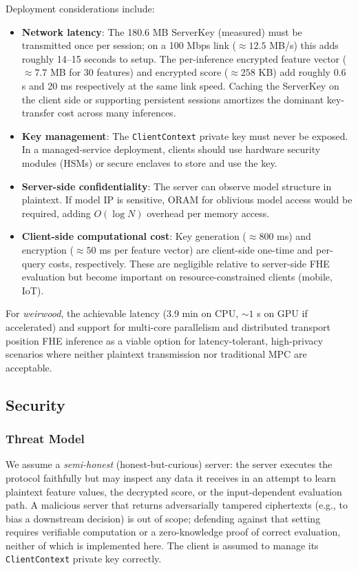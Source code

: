 \documentclass[12pt]{article}
\begin{document}
Deployment considerations include:
\begin{itemize}
\item \textbf{Network latency}: The 180.6 MB ServerKey (measured) must be transmitted once per session; on a 100 Mbps link ($\approx 12.5$ MB/s) this adds roughly 14--15 seconds to setup. The per-inference encrypted feature vector ($\approx 7.7$ MB for 30 features) and encrypted score ($\approx 258$ KB) add roughly 0.6 s and 20 ms respectively at the same link speed. Caching the ServerKey on the client side or supporting persistent sessions amortizes the dominant key-transfer cost across many inferences.
\item \textbf{Key management}: The \texttt{ClientContext} private key must never be exposed. In a managed-service deployment, clients should use hardware security modules (HSMs) or secure enclaves to store and use the key.
\item \textbf{Server-side confidentiality}: The server can observe model structure in plaintext. If model IP is sensitive, ORAM for oblivious model access would be required, adding $O(\log N)$ overhead per memory access.
\item \textbf{Client-side computational cost}: Key generation ($\approx 800$ ms) and encryption ($\approx 50$ ms per feature vector) are client-side one-time and per-query costs, respectively. These are negligible relative to server-side FHE evaluation but become important on resource-constrained clients (mobile, IoT).
\end{itemize}

For \textit{weirwood}, the achievable latency (3.9 min on CPU, $\sim 1$ s on GPU if accelerated) and support for multi-core parallelism and distributed transport position FHE inference as a viable option for latency-tolerant, high-privacy scenarios where neither plaintext transmission nor traditional MPC are acceptable.

\subsection{Security}

\subsubsection*{Threat Model}

We assume a \textit{semi-honest} (honest-but-curious) server: the server executes the protocol faithfully but may inspect any data it receives in an attempt to learn plaintext feature values, the decrypted score, or the input-dependent evaluation path. A malicious server that returns adversarially tampered ciphertexts (e.g., to bias a downstream decision) is out of scope; defending against that setting requires verifiable computation or a zero-knowledge proof of correct evaluation, neither of which is implemented here. The client is assumed to manage its \texttt{ClientContext} private key correctly.
\end{document}

